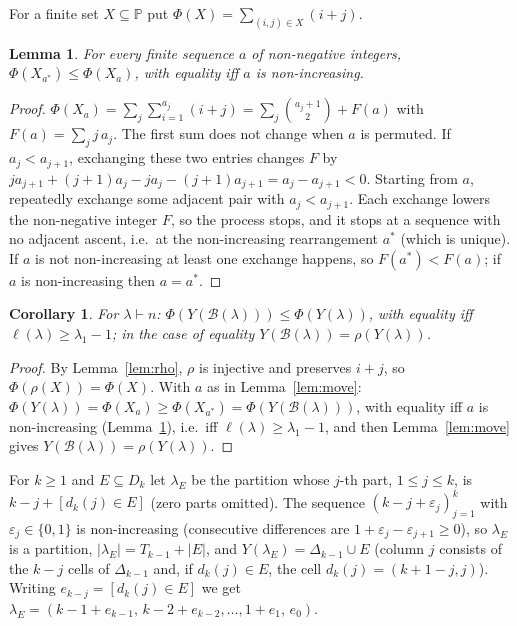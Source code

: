 \documentclass[11pt]{article}
\newtheorem{lemma}[theorem]{Lemma}
\newtheorem{corollary}[theorem]{Corollary}
\theoremstyle{definition}
\newcommand{\PP}{\mathbb{P}}
\newcommand{\B}{\mathcal{B}}
\renewcommand{\le}{\leqslant}
\renewcommand{\ge}{\geqslant}
\begin{document}
For a finite set $X\subseteq\PP$ put $\Phi(X)=\sum_{(i,j)\in X}(i+j)$.

\begin{lemma}\label{lem:rearr}
For every finite sequence $a$ of non-negative integers, $\Phi(X_{a^*})\le\Phi(X_a)$, with equality iff $a$
is non-increasing.
\end{lemma}
\begin{proof}
$\Phi(X_a)=\sum_j\sum_{i=1}^{a_j}(i+j)=\sum_j\binom{a_j+1}{2}+F(a)$ with $F(a)=\sum_j j\,a_j$.
The first sum does not change when $a$ is permuted.  If $a_j<a_{j+1}$, exchanging these two entries
changes $F$ by $j a_{j+1}+(j+1)a_j-ja_j-(j+1)a_{j+1}=a_j-a_{j+1}<0$.  Starting from $a$, repeatedly exchange
some adjacent pair with $a_j<a_{j+1}$.  Each exchange lowers the non-negative integer $F$, so the process
stops, and it stops at a sequence with no adjacent ascent, i.e.\ at the non-increasing rearrangement
$a^*$ (which is unique).  If $a$ is not non-increasing at least one exchange happens, so $F(a^*)<F(a)$; if
$a$ is non-increasing then $a=a^*$.
\end{proof}

\begin{corollary}\label{cor:energy}
For $\lambda\vdash n$: $\Phi(Y(\B(\lambda)))\le\Phi(Y(\lambda))$, with equality iff $\ell(\lambda)\ge\lambda_1-1$;
in the case of equality $Y(\B(\lambda))=\rho(Y(\lambda))$.
\end{corollary}
\begin{proof}
By Lemma~\ref{lem:rho}, $\rho$ is injective and preserves $i+j$, so $\Phi(\rho(X))=\Phi(X)$.  With $a$ as in
Lemma~\ref{lem:move}: $\Phi(Y(\lambda))=\Phi(X_a)\ge\Phi(X_{a^*})=\Phi(Y(\B(\lambda)))$, with equality iff $a$ is
non-increasing (Lemma~\ref{lem:rearr}), i.e.\ iff $\ell(\lambda)\ge\lambda_1-1$, and then
Lemma~\ref{lem:move} gives $Y(\B(\lambda))=\rho(Y(\lambda))$.
\end{proof}

For $k\ge1$ and $E\subseteq D_k$ let $\lambda_E$ be the partition whose $j$-th part, $1\le j\le k$, is
$k-j+[d_k(j)\in E]$ (zero parts omitted).  The sequence $(k-j+\varepsilon_j)_{j=1}^k$ with
$\varepsilon_j\in\{0,1\}$ is non-increasing (consecutive differences are $1+\varepsilon_j-\varepsilon_{j+1}\ge0$),
so $\lambda_E$ is a partition, $|\lambda_E|=T_{k-1}+|E|$, and $Y(\lambda_E)=\Delta_{k-1}\cup E$ (column $j$ consists
of the $k-j$ cells of $\Delta_{k-1}$ and, if $d_k(j)\in E$, the cell $d_k(j)=(k+1-j,j)$).  Writing
$e_{k-j}=[d_k(j)\in E]$ we get $\lambda_E=(k-1+e_{k-1},\,k-2+e_{k-2},\dots,1+e_1,\,e_0)$.
\end{document}
